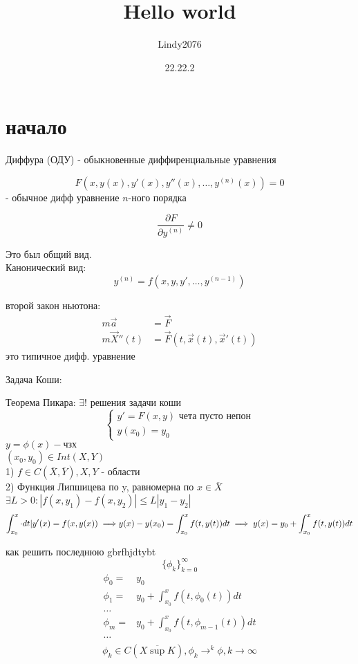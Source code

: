 \documentclass[12pt, a4paper]{article}
\title{Hello world}
\author{Lindy2076}
\date{22.22.2} %
\begin{document}
\section{начало}

	Диффура (ОДУ) - обыкновенные диффиренциальные уравнения
	
	$$F(x, y(x), y'(x), y''(x), \dotsc, y^{(n)}(x)) = 0$$ - обычное дифф уравнение $n$-ного порядка
	
	$$\frac{\partial F}{\partial y^{(n)}} \neq 0$$

Это был общий вид.\\
Канонический вид:
$$y^{(n)} = f(x,y,y',\dotsc,y^{(n-1)})$$

второй закон ньютона: 
\begin{align}
m\vec{a} &= \vec{F} \\
m\vec{X}''(t) &= \vec{F}(t, \vec{x}(t), \vec{x}'(t))
\end{align}
это типичное дифф. уравнение

Задача Коши:



Теорема Пикара: $\exists!$ решения задачи коши
$$\begin{cases}
	y' = F(x,y) \text{ чета пусто непон}\\
	y(x_0) = y_0
\end{cases}$$
$ y = \phi(x) - \text{чзх}$\\
$(x_0, y_0) \in Int(X, Y)$\\
1) $f \in C(\overline{X}, \overline{Y}), X, Y$ - области \\
2) Функция Липшицева по y, равномерна по $x \in \overline{X}$
$\exists L>0: | f(x,y_1) - f(x,y_2)| \le L |y_1-y_2|$\\

$$\int^{x}_{x_0} \cdot dt | y'(x) = f(x, y(x)) \implies \\ y(x)-y(x_0) = \int^x_{x_0} f(t, y(t))dt \implies y(x) = y_0 + \int^x_{x_0}f(t,y(t))dt$$

как решить последнюю 
gbrfhjdtybt
$$\{\phi_k\}^\infty_{k=0}$$
$$
\begin{matrix}
\phi_0 =& y_0 \\
\phi_1 =& y_0 + \int^x_{x_0}f(t, \phi_0(t))dt \\
\dotsc \\
\phi_m =& y_0 + \int^x_{x_0}f(t, \phi_{m-1}(t))dt \\
\dotsc \\
\end{matrix}$$
$$ \phi_k \in C(\overline{X \sup K}), \phi_k \rightarrow^k \phi, k\to\infty
$$
\end{document}

